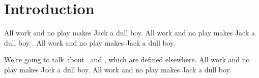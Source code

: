
%
%

%
%

\section{Introduction}
\label{sec:introduction}

All work and no play makes Jack a dull boy.
All work and no play makes Jack a dull boy
\cite{knuth-website,
knuth-fundamental-algorithms,
dirac-quantum-mechanics}.
All work and no play makes Jack a dull boy.

We're going to talk about \varA\ and \varB, which are defined elsewhere.
All work and no play makes Jack a dull boy.
All work and no play makes Jack a dull boy.
